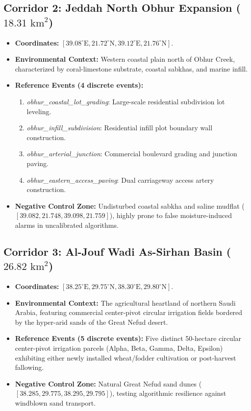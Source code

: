 \subsection{Corridor 2: Jeddah North Obhur Expansion ($18.31\text{ km}^2$)}
\begin{itemize}
    \item \textbf{Coordinates:} $[39.08^\circ\text{E}, 21.72^\circ\text{N}, 39.12^\circ\text{E}, 21.76^\circ\text{N}]$.
    \item \textbf{Environmental Context:} Western coastal plain north of Obhur Creek, characterized by coral-limestone substrate, coastal sabkhas, and marine infill.
    \item \textbf{Reference Events (4 discrete events):}
    \begin{enumerate}
        \item \textit{obhur\_coastal\_lot\_grading}: Large-scale residential subdivision lot leveling.
        \item \textit{obhur\_infill\_subdivision}: Residential infill plot boundary wall construction.
        \item \textit{obhur\_arterial\_junction}: Commercial boulevard grading and junction paving.
        \item \textit{obhur\_eastern\_access\_paving}: Dual carriageway access artery construction.
    \end{enumerate}
    \item \textbf{Negative Control Zone:} Undisturbed coastal sabkha and saline mudflat ($[39.082, 21.748, 39.098, 21.759]$), highly prone to false moisture-induced alarms in uncalibrated algorithms.
\end{itemize}

\subsection{Corridor 3: Al-Jouf Wadi As-Sirhan Basin ($26.82\text{ km}^2$)}
\begin{itemize}
    \item \textbf{Coordinates:} $[38.25^\circ\text{E}, 29.75^\circ\text{N}, 38.30^\circ\text{E}, 29.80^\circ\text{N}]$.
    \item \textbf{Environmental Context:} The agricultural heartland of northern Saudi Arabia, featuring commercial center-pivot circular irrigation fields bordered by the hyper-arid sands of the Great Nefud desert.
    \item \textbf{Reference Events (5 discrete events):} Five distinct 50-hectare circular center-pivot irrigation parcels (Alpha, Beta, Gamma, Delta, Epsilon) exhibiting either newly installed wheat/fodder cultivation or post-harvest fallowing.
    \item \textbf{Negative Control Zone:} Natural Great Nefud sand dunes ($[38.285, 29.775, 38.295, 29.795]$), testing algorithmic resilience against windblown sand transport.
\end{itemize}

